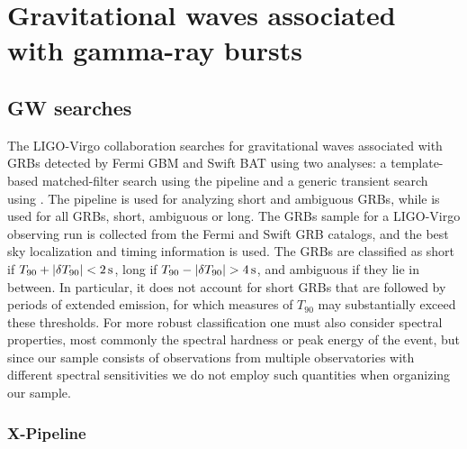 \chapter{Gravitational waves associated with gamma-ray bursts}\label{ch:grb}


\section{GW searches}\label{sec:grb-searches}

The \ac{LIGO}-Virgo collaboration searches for gravitational waves associated with \acp{GRB} detected by Fermi \ac{GBM} and Swift \ac{BAT} using two analyses: a template-based matched-filter search using the \pygrb pipeline and a generic transient search using \xpip.
The \pygrb pipeline is used for analyzing short and ambiguous \acp{GRB}, while \xpip is used for all \acp{GRB}, short, ambiguous or long.
The \acp{GRB} sample for a LIGO-Virgo observing run is collected from the Fermi and Swift \ac{GRB} catalogs, and the best sky localization and timing information is used.
The \acp{GRB} are classified as short if $T_{90} + \abs{\delta T_{90}} < 2\,\text{s}$, long if $T_{90} - \abs{\delta T_{90}} > 4\,\text{s}$, and ambiguous if they lie in between.
In particular, it does not account for short GRBs that are followed by periods of extended emission, for which measures of $T_{90}$ may substantially exceed these thresholds.
For more robust classification one must also consider spectral properties, most commonly the spectral hardness or peak energy of the event, but since our sample consists of observations from multiple observatories with different spectral sensitivities we do not employ such quantities when organizing our sample.

\subsection{X-Pipeline}\label{sec:grb-x}

